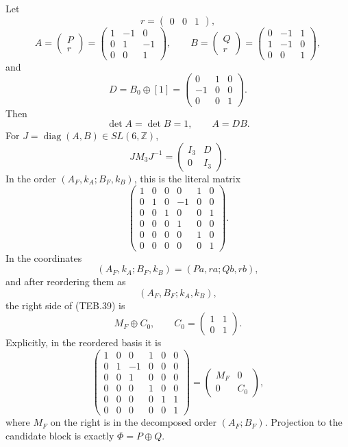 \begin{proposition}
\label{prop:teb-explicit-conjugacy}
Let
\[
 r=\begin{pmatrix}0&0&1\end{pmatrix},
\]
\[
 A=\begin{pmatrix}P\\r\end{pmatrix}
 =\begin{pmatrix}1&-1&0\\0&1&-1\\0&0&1\end{pmatrix},
 \qquad
 B=\begin{pmatrix}Q\\r\end{pmatrix}
 =\begin{pmatrix}0&-1&1\\1&-1&0\\0&0&1\end{pmatrix},
 \tag{TEB.36}
\]
and
\[
 D=B_0\oplus[1]
 =\begin{pmatrix}0&1&0\\-1&0&0\\0&0&1\end{pmatrix}.
 \tag{TEB.37}
\]
Then
\[
 \det A=\det B=1,\qquad A=DB.                           \tag{TEB.38}
\]
For \(J=\operatorname{diag}(A,B)\in SL(6,\mathbb Z)\),
\[
 JM_3J^{-1}=
 \begin{pmatrix}I_3&D\\0&I_3\end{pmatrix}.            \tag{TEB.39}
\]
In the order \((A_F,k_A;B_F,k_B)\), this is the literal matrix
\[
\begin{pmatrix}
1&0&0&0&1&0\\
0&1&0&-1&0&0\\
0&0&1&0&0&1\\
0&0&0&1&0&0\\
0&0&0&0&1&0\\
0&0&0&0&0&1
\end{pmatrix}.
\]
In the coordinates
\[
 (A_F,k_A;B_F,k_B)=(Pa,ra;Qb,rb),
\]
and after reordering them as
\[
 (A_F,B_F;k_A,k_B),
\]
the right side of (TEB.39) is
 \[
 M_F\oplus C_0,
 \qquad C_0=\begin{pmatrix}1&1\\0&1\end{pmatrix}.      \tag{TEB.40}
 \]
Explicitly, in the reordered basis it is
\[
\begin{pmatrix}
1&0&0&1&0&0\\
0&1&-1&0&0&0\\
0&0&1&0&0&0\\
0&0&0&1&0&0\\
0&0&0&0&1&1\\
0&0&0&0&0&1
\end{pmatrix}
=
\begin{pmatrix}M_F&0\\0&C_0\end{pmatrix},
\]
where \(M_F\) on the right is in the decomposed order
\((A_F;B_F)\).
Projection to the candidate block is exactly \(\Phi=P\oplus Q\).
\end{proposition}

